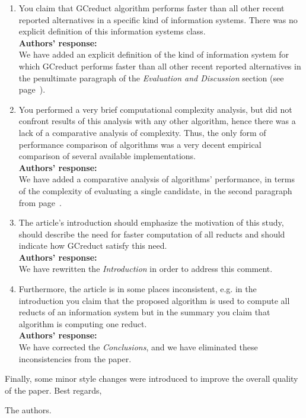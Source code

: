 \documentclass{letter}
\begin{document}
\begin{letter}{}
\begin{enumerate}
	\item You claim that GCreduct algorithm performs faster than all other recent reported alternatives in a specific kind of information systems. There was no explicit definition of this information systems class.\\
	\textbf{Authors’ response:}\\
	We have added an explicit definition of the kind of information system for which GCreduct  performs faster than all other recent reported alternatives in the penultimate paragraph of the \textit{Evaluation and Discussion} section (see page~\pageref{par:kind}).

	\item You performed a very brief computational complexity analysis, but did not confront results of this analysis with any other algorithm, hence there was a lack of a comparative analysis of complexity. Thus, the only form of performance comparison of algorithms was a very decent empirical comparison of several available implementations.\\
	\textbf{Authors’ response:} \\
	We have added a comparative analysis of algorithms' performance, in terms of the complexity of evaluating a single candidate, in the second paragraph from page~\pageref{par:complexity}.
	
	\item The article's introduction should emphasize the motivation of this study, should describe the need for faster computation of all reducts and should indicate how GCreduct satisfy this need.\\
	\textbf{Authors’ response:} \\
	We have rewritten the \textit{Introduction} in order to address this comment. 
	
	\item Furthermore, the article is in some places inconsistent, e.g. in the introduction you  claim that the proposed algorithm is used to compute all reducts of an information system but in the summary you claim that algorithm is computing one reduct. \\
	\textbf{Authors’ response:} \\
	We have corrected the \textit{Conclusions}, and we have eliminated these inconsistencies from the paper. 
  \end{enumerate}  
     
  
  
  Finally, some minor style changes were introduced to improve the overall quality of the paper.
  Best regards,
    
  \begin{flushright}
    The authors.
  \end{flushright}
\end{letter}
\end{document}

